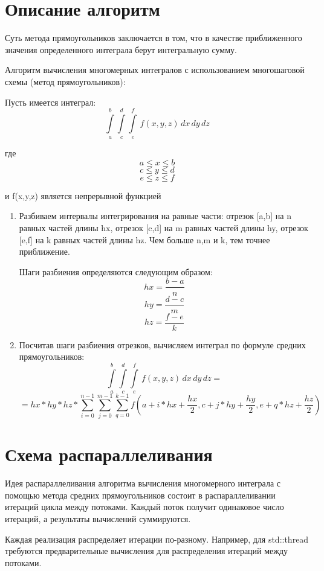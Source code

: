\documentclass{report}
\begin{document}
\section*{Описание алгоритм}
Суть метода прямоугольников заключается в том, что в качестве приближенного значения определенного интеграла берут интегральную сумму.
\par Алгоритм вычисления многомерных интегралов с использованием многошаговой схемы (метод прямоугольников):
\par Пусть имеется интеграл:
$$\int\limits_a^b 
\int\limits_c^d 
\int\limits_e^f \,f(x,y,z)\,dx\,dy\,dz
$$
\par где 
$$ a\le x \le b $$
$$ c \le y \le d $$
$$ e \le z \le f $$
\par и f(x,y,z) является непрерывной функцией
\begin{enumerate}
\item Разбиваем интервалы интегрирования на равные части: отрезок [a,b] на n равных частей длины hx, отрезок [c,d] на m равных частей длины hy, отрезок [e,f] на k равных частей длины hz. Чем больше n,m и k, тем точнее приближение.
\par Шаги разбиения определяются следующим образом:
$$ hx=\frac{b-a}{n} $$
$$ hy=\frac{d-c}{m} $$
$$ hz=\frac{f-e}{k} $$
\item Посчитав шаги разбиения отрезков, вычисляем интеграл по формуле средних прямоугольников:
$$\int\limits_a^b 
\int\limits_c^d 
\int\limits_e^f \,f(x,y,z)\,dx\,dy\,dz=$$
$$ = hx*hy*hz*
\sum\limits_{i=0}^{n-1}
\sum\limits_{j=0}^{m-1}
\sum\limits_{q=0}^{k-1}
f(a+i*hx+\frac{hx}{2}, c+j*hy+\frac{hy}{2},e+q*hz+\frac{hz}{2})
$$
\end{enumerate}
\par
\par 
\newpage

\section*{Схема распараллеливания}
Идея распараллеливания алгоритма вычисления многомерного интеграла с помощью метода средних прямоугольников состоит в распараллеливании итераций цикла между потоками. Каждый поток получит одинаковое число итераций, а результаты вычислений суммируются.
\par Каждая реализация распределяет итерации по-разному. Например, для std::thread требуются предварительные вычисления для распределения итераций между потоками.
\newpage
\end{document}
